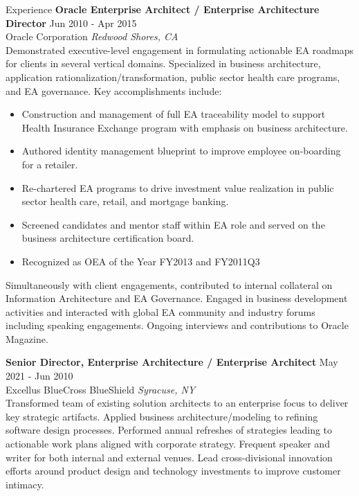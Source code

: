 \documentclass{resume} %
\begin{document}
\begin{rSection}{Experience}
\textbf{Oracle Enterprise Architect / Enterprise Architecture Director} \hfill Jun 2010 - Apr 2015\\
Oracle Corporation \hfill \textit{Redwood Shores, CA}\\
Demonstrated executive-level engagement in formulating actionable EA roadmaps for clients in several vertical domains. Specialized in business architecture, application rationalization/transformation, public sector health care programs, and EA governance. Key accomplishments include:
\begin{itemize}
  \itemsep -3pt {} 
  \item Construction and management of full EA traceability model to support Health Insurance Exchange program with emphasis on business architecture.
  \item Authored identity management blueprint to improve employee on-boarding for a retailer.
  \item Re-chartered EA programs to drive investment value realization in public sector health care, retail, and mortgage banking.
  \item Screened candidates and mentor staff within EA role and served on the business architecture certification board.
  \item Recognized as OEA of the Year FY2013 and FY2011Q3
\end{itemize}
Simultaneously with client engagements, contributed to internal collateral on Information Architecture and EA Governance. Engaged in business development activities and interacted with global EA community and industry forums including speaking engagements. Ongoing interviews and contributions to Oracle Magazine.

\end{rSection} 

\textbf{Senior Director, Enterprise Architecture / Enterprise Architect} \hfill May 2021 - Jun 2010\\
Excellus BlueCross BlueShield \hfill \textit{Syracuse, NY}\\
Transformed team of existing solution architects to an enterprise focus to deliver key strategic artifacts. Applied business architecture/modeling to refining software design processes. Performed annual refreshes of strategies leading to actionable work plans aligned with corporate strategy. Frequent speaker and writer for both internal and external venues. Lead cross-divisional innovation efforts around product design and technology investments to improve customer intimacy.
\end{document}
